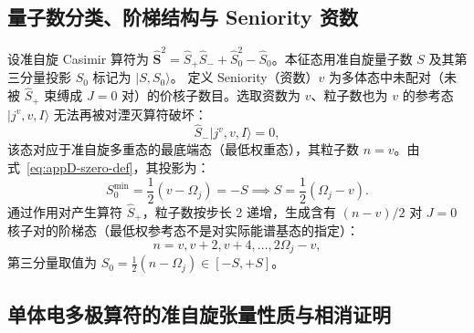 \subsection{量子数分类、阶梯结构与 Seniority 资数}

设准自旋 Casimir 算符为 $\hat{\mathbf{S}}^2 = \hat{S}_+ \hat{S}_- + \hat{S}_0^2 - \hat{S}_0$。本征态用准自旋量子数 $S$ 及其第三分量投影 $S_0$ 标记为 $|S, S_0\rangle$。
定义 Seniority（资数）$v$ 为多体态中未配对（未被 $\hat{S}_+$ 束缚成 $J=0$ 对）的价核子数目。选取资数为 $v$、粒子数也为 $v$ 的参考态 $|j^v, v, I\rangle$ 无法再被对湮灭算符破坏：
\begin{equation}\label{eq:appD-seniority-ground-cond}
\hat{S}_- |j^v, v, I\rangle = 0,
\end{equation}
该态对应于准自旋多重态的最底端态（最低权重态），其粒子数 $n = v$。由式~\eqref{eq:appD-szero-def}，其投影为：
\begin{equation}\label{eq:appD-s0-lowest}
S_0^{\min} = \frac{1}{2}(v - \Omega_j) = -S \implies S = \frac{1}{2}(\Omega_j - v).
\end{equation}
通过作用对产生算符 $\hat{S}_+$，粒子数按步长 2 递增，生成含有 $(n-v)/2$ 对 $J=0$ 核子对的阶梯态（最低权参考态不是对实际能谱基态的指定）：
\begin{equation}\label{eq:appD-quasispin-ladder}
n = v, v + 2, v + 4, \dots, 2\Omega_j - v,
\end{equation}
第三分量取值为 $S_0 = \frac{1}{2}(n - \Omega_j) \in [-S, +S]$。

\subsection{单体电多极算符的准自旋张量性质与相消证明}

